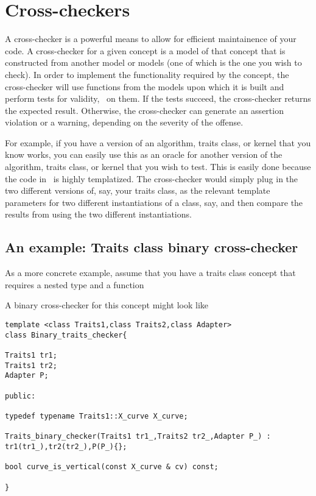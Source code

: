 \section{Cross-checkers}
\label{sec:debugging_cross_checker}

A cross-checker is a powerful means to allow for efficient maintainence 
of your code.  A cross-checker for a given concept is a model of that concept
that is constructed from another model or models (one of which is the one
you wish to check).  In order to implement the functionality required by
the concept, the cross-checker will use functions from the models upon
which it is built and perform tests for validity, \etc\ on them.  If the tests
succeed, the cross-checker returns the expected result.  Otherwise, the
cross-checker can generate an assertion violation or a warning, depending
on the severity of the offense. 

For example, if you have a version of an algorithm, traits class, or kernel 
that you know works, you can easily use this as an oracle for another version 
of the algorithm, traits class, or kernel that you wish to test.  This is
easily done because the code in \cgal\ is highly templatized.  The cross-checker
would simply plug in the two different versions of, say, your traits class, as 
the relevant template parameters for two different instantiations of a
class, say, and then compare the results from using the two different 
instantiations.

\subsection*{An example: Traits class binary cross-checker}

As a more concrete example, assume that you have a traits class concept 
that requires a nested type  and a function


A binary cross-checker for this concept might look like 
\begin{verbatim}
template <class Traits1,class Traits2,class Adapter>
class Binary_traits_checker{

Traits1 tr1;
Traits1 tr2;
Adapter P;

public:

typedef typename Traits1::X_curve X_curve;

Traits_binary_checker(Traits1 tr1_,Traits2 tr2_,Adapter P_) :
tr1(tr1_),tr2(tr2_),P(P_){};

bool curve_is_vertical(const X_curve & cv) const;

}
\end{verbatim}


